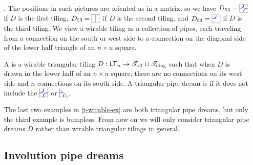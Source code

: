 \documentclass[10pt]{article}
\begin{document}
.
\ee
The positions in such pictures are oriented as in a matrix,
so we have $D_{53}=\ETILE$ if $D$ is the first tiling,
 $D_{53}=\VTILE$ if $D$ is the second tiling,
 and
 $D_{53}=\JTILE$ if $D$ is the third tiling.
 We view a wirable tiling as a collection of pipes, each 
traveling from a connection on the south or west side to
a connection on the diagonal side of the lower half triangle of an $n\times n$ square.


\begin{definition}\label{tpd-def}
A  is a wirable triangular tiling $D : \mathsf{LT}_n \to \mathscr{T}_{\mathrm{off}}\sqcup \mathscr{T}_{\mathrm{diag}}$ 
such that when $D$ is drawn in 
the lower half of an $n\times n$ square, 
there are no connections on its west side and
  $n$ connections on its south side.
  A triangular pipe dream is  if it does not include the  $\ETILE$ or $\EDIAG$.
 \end{definition}
 
 


The last two examples in \eqref{t-wirable-ex} 
are both triangular pipe dreams, but only the third example 
is bumpless.
From now on we will only consider triangular pipe dreams
$D$ rather than wirable triangular tilings in general.

\subsection{Involution pipe dreams}
\end{document}
